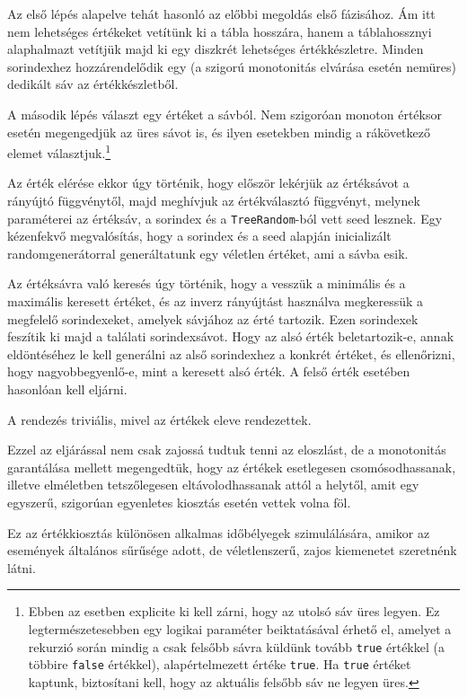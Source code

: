 \documentclass[
    parspace, %
    noindent, %
]{elteiktdk}[2023/04/10]
\begin{document}
Az első lépés alapelve tehát hasonló az előbbi megoldás első fázisához.
Ám itt nem lehetséges értékeket vetítünk ki a tábla hosszára,
hanem a táblahossznyi alaphalmazt vetítjük majd ki egy diszkrét lehetséges értékkészletre.
Minden sorindexhez hozzárendelődik egy (a szigorú monotonitás elvárása esetén nemüres)
dedikált sáv az értékkészletből.

A második lépés választ egy értéket a sávból.
Nem szigoróan monoton értéksor esetén megengedjük az üres sávot is,
és ilyen esetekben mindig a rákövetkező elemet választjuk.\footnote{
  Ebben az esetben explicite ki kell zárni, hogy az utolsó sáv üres legyen.
  Ez legtermészetesebben egy logikai paraméter beiktatásával érhető el,
  amelyet a rekurzió során mindig a csak felsőbb sávra küldünk tovább \texttt{true} értékkel
  (a többire \texttt{false} értékkel),
  alapértelmezett értéke \texttt{true}.
  Ha \texttt{true} értéket kaptunk, biztosítani kell, hogy az aktuális felsőbb sáv ne legyen üres.
}

Az érték elérése ekkor úgy történik, hogy először lekérjük az értéksávot a rányújtó függvénytől,
majd meghívjuk az értékválasztó függvényt,
melynek paraméterei az értéksáv, a sorindex és a \texttt{TreeRandom}-ból vett seed lesznek.
Egy kézenfekvő megvalósítás,
hogy a sorindex és a seed alapján inicializált randomgenerátorral
generáltatunk egy véletlen értéket, ami a sávba esik.

Az értéksávra való keresés úgy történik, hogy a vesszük a minimális és a maximális keresett értéket,
és az inverz rányújtást használva megkeressük a megfelelő sorindexeket, amelyek sávjához az érté tartozik.
Ezen sorindexek feszítik ki majd a találati sorindexsávot.
Hogy az alsó érték beletartozik-e, annak eldöntéséhez le kell generálni
az alső sorindexhez a konkrét értéket, és ellenőrizni, hogy nagyobbegyenlő-e,
mint a keresett alsó érték.
A felső érték esetében hasonlóan kell eljárni.

A rendezés triviális, mivel az értékek eleve rendezettek.

Ezzel az eljárással nem csak zajossá tudtuk tenni az eloszlást,
de a monotonitás garantálása mellett megengedtük,
hogy az értékek esetlegesen csomósodhassanak,
illetve elméletben tetszőlegesen eltávolodhassanak attól a helytől,
amit egy egyszerű, szigorúan egyenletes kiosztás esetén vettek volna föl.

Ez az értékkiosztás különösen alkalmas időbélyegek szimulálására,
amikor az események általános sűrűsége adott,
de véletlenszerű, zajos kiemenetet szeretnénk látni.
\end{document}
